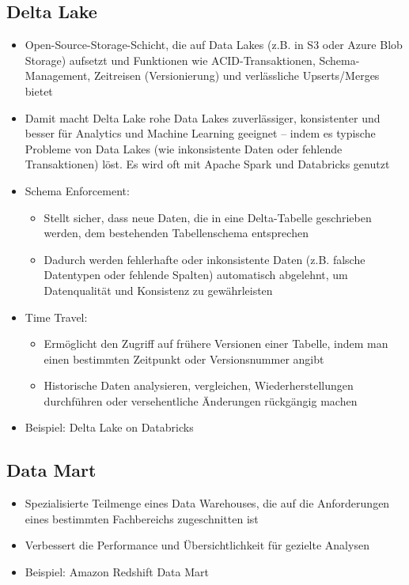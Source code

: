 \documentclass[11pt]{scrartcl}
\begin{document}
\subsection{Delta Lake}
\begin{itemize}
	\item Open-Source-Storage-Schicht, die auf Data Lakes (z.B. in S3 oder Azure Blob Storage) aufsetzt und Funktionen wie ACID-Transaktionen, Schema-Management, Zeitreisen (Versionierung) und verlässliche Upserts/Merges bietet
	\item Damit macht Delta Lake rohe Data Lakes zuverlässiger, konsistenter und besser für Analytics und Machine Learning geeignet – indem es typische Probleme von Data Lakes (wie inkonsistente Daten oder fehlende Transaktionen) löst. Es wird oft mit Apache Spark und Databricks genutzt
	\item Schema Enforcement:
	\begin{itemize}
		\item Stellt sicher, dass neue Daten, die in eine Delta-Tabelle geschrieben werden, dem bestehenden Tabellenschema entsprechen
		\item Dadurch werden fehlerhafte oder inkonsistente Daten (z.B. falsche Datentypen oder fehlende Spalten) automatisch abgelehnt, um Datenqualität und Konsistenz zu gewährleisten
	\end{itemize}
	\item Time Travel:
	\begin{itemize}
		\item Ermöglicht den Zugriff auf frühere Versionen einer Tabelle, indem man einen bestimmten Zeitpunkt oder Versionsnummer angibt
		\item Historische Daten analysieren, vergleichen, Wiederherstellungen durchführen oder versehentliche Änderungen rückgängig machen
	\end{itemize}
	\item Beispiel: Delta Lake on Databricks
\end{itemize}	


\subsection{Data Mart}
\begin{itemize}
	\item Spezialisierte Teilmenge eines Data Warehouses, die auf die Anforderungen eines bestimmten Fachbereichs zugeschnitten ist
	\item Verbessert die Performance und Übersichtlichkeit für gezielte Analysen
	\item Beispiel: Amazon Redshift Data Mart
\end{itemize}
\end{document}

